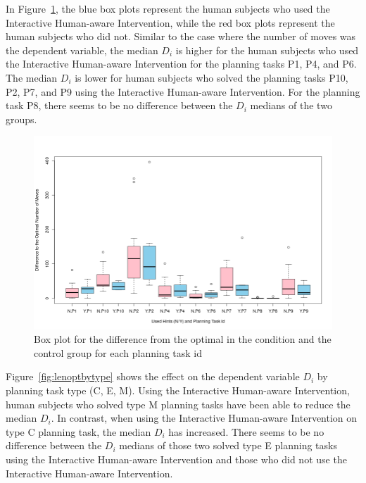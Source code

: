 In Figure~\ref{fig:lenoptbypid}, the blue box plots represent the human subjects who used the Interactive Human-aware Intervention, while the red box plots represent the human subjects who did not.
Similar to the case where the number of moves was the dependent variable, the median $D_i$ is higher for the human subjects who used the Interactive Human-aware Intervention for the planning tasks P1, P4, and P6.
The median $D_i$ is lower for human subjects who solved the planning tasks P10, P2, P7, and P9 using the Interactive Human-aware Intervention.
For the planning task P8, there seems to be no difference between the $D_i$ medians of the two groups.
\begin{figure}[tpb]
  \centering
\includegraphics[width=\columnwidth]{img/lenoptbypid.png}
  \caption{Box plot for the difference from the optimal in the condition and the control group for each planning task id}
  \label{fig:lenoptbypid}
\end{figure}

Figure~\ref{fig:lenoptbytype} shows the effect on the  dependent variable $D_i$ by planning task type (C, E, M).
Using the Interactive Human-aware Intervention, human subjects who solved type M planning tasks have been able to reduce the median $D_i$.
In contrast, when using the Interactive Human-aware Intervention on type C planning task, the median $D_i$ has increased.
There seems to be no difference between the $D_i$ medians of those two solved type E planning tasks using the Interactive Human-aware Intervention and those who did not use the Interactive Human-aware Intervention.

